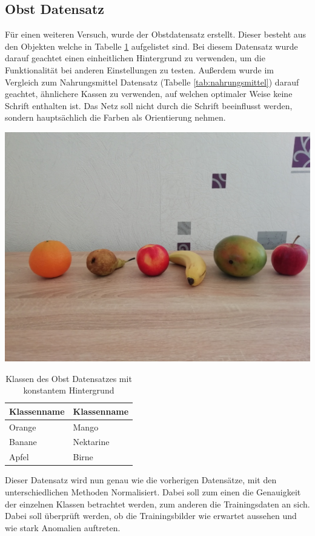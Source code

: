 \documentclass[a4paper,12pt,oneside]{article}
\begin{document}
\subsection{Obst Datensatz}
Für einen weiteren Versuch, wurde der Obstdatensatz erstellt. Dieser besteht aus den Objekten welche in Tabelle \ref{tab:obst} aufgelistet sind. Bei diesem Datensatz wurde darauf geachtet einen einheitlichen Hintergrund zu verwenden, um die Funktionalität bei anderen Einstellungen zu testen. Außerdem wurde im Vergleich zum Nahrungsmittel Datensatz (Tabelle \ref{tab:nahrungsmittel}) darauf geachtet, ähnlichere Kassen zu verwenden, auf welchen optimaler Weise keine Schrift enthalten ist. Das Netz soll nicht durch die Schrift beeinflusst werden, sondern hauptsächlich die Farben als Orientierung nehmen.
\begin{table}[htb]
\caption{Klassen des Obst Datensatzes mit konstantem Hintergrund}
\center
\begin{minipage}[c]{.4\textwidth} 
\includegraphics[width=.7\textwidth]{Sources/Obst_mit_hintergrund}  
\end{minipage} 
\begin{minipage}[c]{.4\textwidth}\label{tab:obst}   
\begin{tabular}{|l|l|}
\hline
Klassenname & Klassenname\\
\hline
Orange & Mango\\
Banane & Nektarine\\
Apfel & Birne\\
\hline
\end{tabular} 
\end{minipage}
\end{table}  
Dieser Datensatz wird nun genau wie die vorherigen Datensätze, mit den unterschiedlichen Methoden Normalisiert. Dabei soll zum einen die Genauigkeit der einzelnen Klassen betrachtet werden, zum anderen die Trainingsdaten an sich. Dabei soll überprüft werden, ob die Trainingsbilder wie erwartet aussehen und wie stark Anomalien auftreten. 
\end{document}
